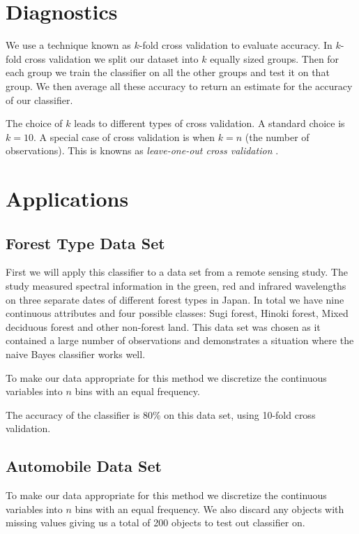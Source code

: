 \section{Diagnostics}

We use a technique known as $k$-fold cross validation to evaluate accuracy. In $k$-fold cross validation we split our dataset into $k$ equally sized groups. Then for each group we train the classifier on all the other groups and test it on that group. We then average all these accuracy to return an estimate for the accuracy of our classifier.

The choice of $k$ leads to different types of cross validation. A standard choice is $k=10$. A special case of cross validation is when $k=n$ (the number of observations). This is knowns as \textit{leave-one-out cross validation} \cite{Priddy05}.

\section{Applications}

\subsection{Forest Type Data Set}

First we will apply this classifier to a data set from a remote sensing study. The study measured spectral information in the green, red and infrared wavelengths on three separate dates of different forest types in Japan. In total we have nine continuous attributes and four possible classes: Sugi forest, Hinoki forest, Mixed deciduous forest and other non-forest land. This data set was chosen as it contained a large number of observations and demonstrates a situation where the naive Bayes classifier works well.

To make our data appropriate for this method we discretize the continuous variables into $n$ bins with an equal frequency.

The accuracy of the classifier is 80\% on this data set, using 10-fold cross validation.

\subsection{Automobile Data Set}

To make our data appropriate for this method we discretize the continuous variables into $n$ bins with an equal frequency. We also discard any objects with missing values giving us a total of 200 objects to test out classifier on.

